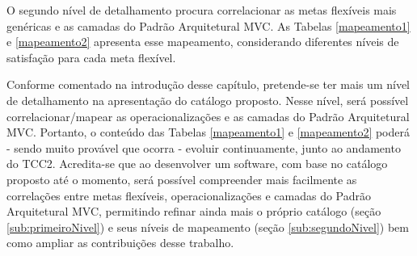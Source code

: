 O segundo nível de detalhamento procura correlacionar as metas flexíveis mais genéricas e as camadas do Padrão Arquitetural MVC. As Tabelas \ref{mapeamento1} e \ref{mapeamento2} apresenta esse mapeamento, considerando diferentes níveis de satisfação para cada meta flexível.


Conforme comentado na introdução desse capítulo, pretende-se ter mais um nível de detalhamento na apresentação do catálogo proposto. Nesse nível, será possível correlacionar/mapear as operacionalizações e as camadas do Padrão Arquitetural MVC. Portanto, o conteúdo das Tabelas \ref{mapeamento1} e \ref{mapeamento2} poderá - sendo muito provável que ocorra - evoluir continuamente, junto ao andamento do TCC2. Acredita-se que ao desenvolver um software, com base no catálogo proposto até o momento, será possível compreender mais facilmente as correlações entre metas flexíveis, operacionalizações e camadas do Padrão Arquitetural MVC, permitindo refinar ainda mais o próprio catálogo (seção \ref{sub:primeiroNivel}) e seus níveis de mapeamento (seção \ref{sub:segundoNivel}) bem como ampliar as contribuições desse trabalho.

